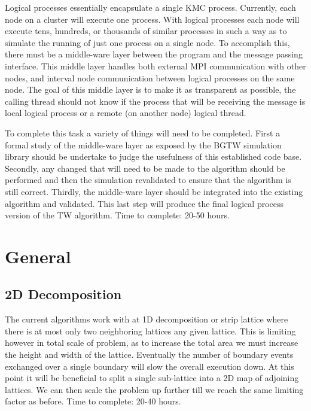 Logical processes essentially encapsulate a single KMC process.  Currently, each node on a cluster will execute one process.  With logical processes each node will execute tens, hundreds, or thousands of similar processes in such a way as to simulate the running of just one process on a single node.  To accomplish this, there must be a middle-ware layer between the program and the message passing interface.  This middle layer handles both external MPI communication with other nodes, and interval node communication between logical processes on the same node.  The goal of this middle layer is to make it as transparent as possible, the calling thread should not know if the process that will be receiving the message is local logical process or a remote (on another node) logical thread.

To complete this task a variety of things will need to be completed.  First a formal study of the middle-ware layer as exposed by the BGTW simulation library should be undertake to judge the usefulness of this established code base.  Secondly, any changed that will need to be made to the algorithm should be performed and then the simulation revalidated to ensure that the algorithm is still correct.  Thirdly, the middle-ware layer should be integrated into the existing algorithm and validated.  This last step will produce the final logical process version of the TW algorithm. Time to complete: 20-50 hours.

\section{General}

\subsection{2D Decomposition}
The current algorithms work with at 1D decomposition or strip lattice where there is at most only two neighboring lattices any given lattice.  This is limiting however in total scale of problem, as to increase the total area we must increase the height and width of the lattice.  Eventually the number of boundary events exchanged over a single boundary will slow the overall execution down.  At this point it will be beneficial to split a single sub-lattice into a 2D map of adjoining lattices.  We can then scale the problem up further till we reach the same limiting factor as before.  Time to complete: 20-40 hours.
